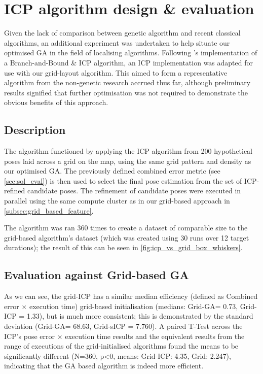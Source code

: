 \documentclass[authoryearcitations]{UoYCSproject}
\begin{document}
\color{black}

\chapter{ICP algorithm design \& evaluation}
\label{cha:icp_algorithm}

\color{red}
Given the lack of comparison between genetic algorithm and recent classical algorithms, an additional experiment was undertaken to help situate our optimised GA in the field of localising algorithms. Following \citet{Yang2013-gx}'s implementation of a Branch-and-Bound \& ICP algorithm, an ICP implementation \cite{Harry_undated-ea} was adapted for use with our grid-layout algorithm. This aimed to form a representative algorithm from the non-genetic research accrued thus far, although preliminary results signified that further optimisation was not required to demonstrate the obvious benefits of this approach.

\section{Description}
The algorithm functioned by applying the ICP algorithm from 200 hypothetical poses laid across a grid on the map, using the same grid pattern and density as our optimised GA. The previously defined combined error metric (see \autoref{sec:sol_eval}) is then used to select the final pose estimation from the set of ICP-refined candidate poses. The refinement of candidate poses were executed in parallel using the same compute cluster as in our grid-based approach in \autoref{subsec:grid_based_feature}. \newline

The algorithm was ran 360 times to create a dataset of comparable size to the grid-based algorithm's dataset (which was created using 30 runs over 12 target durations); the result of this can be seen in \autoref{fig:icp_vs_grid_box_whiskers}. 


\color{black}

\section{Evaluation against Grid-based GA}
As we can see, the grid-ICP has a similar median efficiency (defined as Combined error $\times$ execution time) grid-based initialisation (medians: Grid-GA= 0.73, Grid-ICP = 1.33), but is much more consistent; this is demonstrated by the standard deviation (Grid-GA= 68.63, Grid-sICP = 7.760). A paired T-Test across the ICP's pose error $\times$ execution time results and the equivalent results from the range of executions of the grid-initialised algorithms found the means to be significantly different (N=360, p<0, means: Grid-ICP: 4.35, Grid: 2.247), indicating that the GA based algorithm is indeed more efficient. \newline
\end{document}
